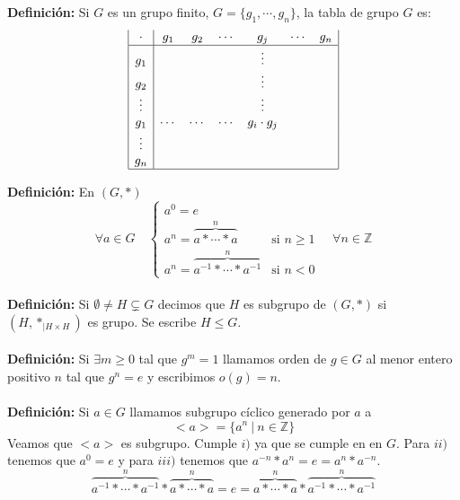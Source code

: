 \documentclass{article}
\begin{document}
\textbf{Definición:} Si $G$ es un grupo finito, $G=\{g_1,\cdots,g_n\}$, la tabla de grupo $G$ es:
$$
\begin{array}{|c|cccccc|}
    \cdot   & g_1    & g_2    & \cdots &   g_j        & \cdots & g_n \\\hline
     g_1    &        &        &        & \vdots       &        &     \\ 
     g_2    &        &        &        & \vdots       &        &     \\
     \vdots &        &        &        & \vdots       &        &     \\
     g_1    & \cdots & \cdots & \cdots & g_i\cdot g_j &        &     \\
     \vdots &        &        &        &              &        &     \\
     g_n    &        &        &        &              &        &     \\\hline
\end{array}
$$


\textbf{Definición:} En $(G,*)$
$$
\forall a \in G \quad
\left\{\begin{array}{ll}
    a^0=e\\
    a^n=\overbrace{a*\cdots*a}^n & \text{si }n\ge 1 \\
    a^n=\overbrace{a^{-1}*\cdots*a^{-1}}^n & \text{si }n< 0
\end{array}\right. \quad \forall n \in \mathbb{Z}
$$\\


\textbf{Definición:} Si $\emptyset \ne H\subsetneq G$ decimos que $H$ es subgrupo de $(G,*)$ si $(H,*_{|H\times H})$ es grupo. Se escribe $H \le G$.\\\\
\textbf{Definición:} Si $\exists m\ge 0$ tal que $g^m=1$ llamamos orden de $g\in G$ al menor entero positivo $n$ tal que $g^n=e$ y escribimos $o(g)=n$.\\\\


\textbf{Definición:} Si $a\in G$ llamamos subgrupo cíclico generado por $a$ a
$$
<a>=\{a^n\:|\:n\in\mathbb{Z}\}
$$
Veamos que $<a>$ es subgrupo. Cumple $i)$ ya que se cumple en en $G$. Para $ii)$ tenemos que $a^0=e$ y para $iii)$ tenemos que $a^{-n}*a^n=e=a^n*a^{-n}$.
$$
\overbrace{a^{-1}*\cdots*a^{-1}}^n*\overbrace{a*\cdots*a}^n=e=\overbrace{a*\cdots*a}^n*\overbrace{a^{-1}*\cdots*a^{-1}}^n
$$\\
\end{document}
